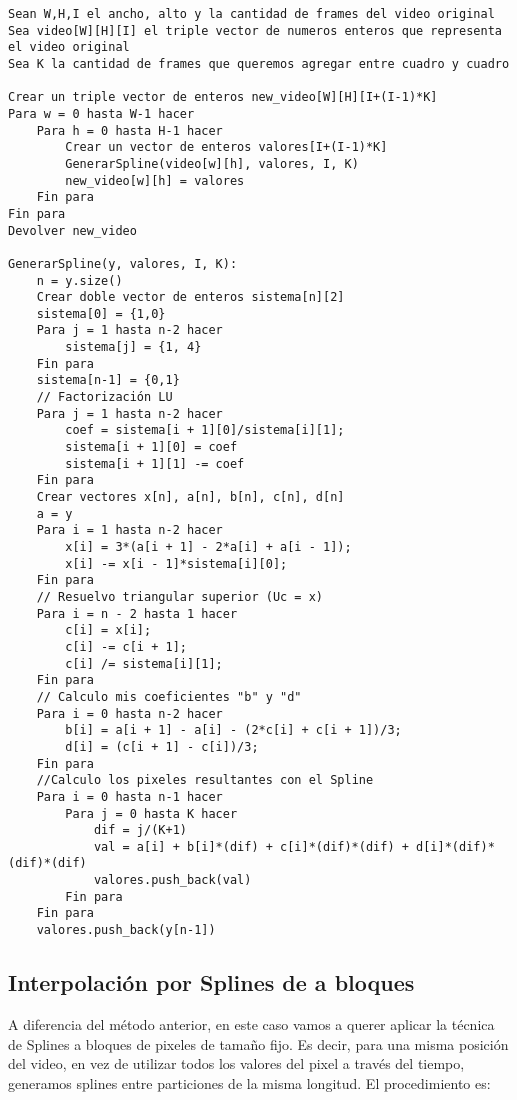 \begin{lstlisting}
Sean W,H,I el ancho, alto y la cantidad de frames del video original
Sea video[W][H][I] el triple vector de numeros enteros que representa el video original
Sea K la cantidad de frames que queremos agregar entre cuadro y cuadro

Crear un triple vector de enteros new_video[W][H][I+(I-1)*K]
Para w = 0 hasta W-1 hacer
	Para h = 0 hasta H-1 hacer
		Crear un vector de enteros valores[I+(I-1)*K]
		GenerarSpline(video[w][h], valores, I, K)
		new_video[w][h] = valores
	Fin para
Fin para
Devolver new_video

GenerarSpline(y, valores, I, K):
	n = y.size()
	Crear doble vector de enteros sistema[n][2]
	sistema[0] = {1,0}
	Para j = 1 hasta n-2 hacer
		sistema[j] = {1, 4}
	Fin para
	sistema[n-1] = {0,1}
	// Factorización LU
	Para j = 1 hasta n-2 hacer
		coef = sistema[i + 1][0]/sistema[i][1];
		sistema[i + 1][0] = coef
		sistema[i + 1][1] -= coef
	Fin para
	Crear vectores x[n], a[n], b[n], c[n], d[n]
	a = y
	Para i = 1 hasta n-2 hacer
		x[i] = 3*(a[i + 1] - 2*a[i] + a[i - 1]);
		x[i] -= x[i - 1]*sistema[i][0];
	Fin para
	// Resuelvo triangular superior (Uc = x)
	Para i = n - 2 hasta 1 hacer
		c[i] = x[i];
		c[i] -= c[i + 1];
		c[i] /= sistema[i][1];
	Fin para
	// Calculo mis coeficientes "b" y "d"
	Para i = 0 hasta n-2 hacer
		b[i] = a[i + 1] - a[i] - (2*c[i] + c[i + 1])/3;
		d[i] = (c[i + 1] - c[i])/3;
	Fin para
	//Calculo los pixeles resultantes con el Spline
	Para i = 0 hasta n-1 hacer
		Para j = 0 hasta K hacer
			dif = j/(K+1)
			val = a[i] + b[i]*(dif) + c[i]*(dif)*(dif) + d[i]*(dif)*(dif)*(dif)
			valores.push_back(val)
		Fin para
	Fin para
	valores.push_back(y[n-1])
\end{lstlisting}

\subsection{Interpolación por Splines de a bloques}

A diferencia del método anterior, en este caso vamos a querer aplicar la técnica de Splines a bloques de pixeles de tamaño fijo. Es decir, para una misma posición del video, en vez de utilizar todos los valores del pixel a través del tiempo, generamos splines entre particiones de la misma longitud. El procedimiento es:

